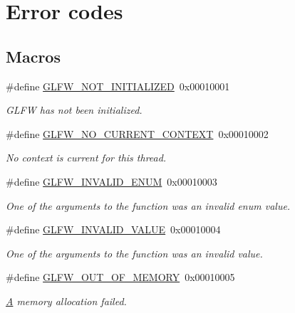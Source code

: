 \hypertarget{group__errors}{}\section{Error codes}
\label{group__errors}
\subsection*{Macros}
\begin{DoxyCompactItemize}
\item 
\#define \hyperlink{group__errors_ga2374ee02c177f12e1fa76ff3ed15e14a}{G\+L\+F\+W\+\_\+\+N\+O\+T\+\_\+\+I\+N\+I\+T\+I\+A\+L\+I\+Z\+E\+D}~0x00010001
\begin{DoxyCompactList}\small\item\em G\+L\+F\+W has not been initialized. \end{DoxyCompactList}\item 
\#define \hyperlink{group__errors_gaa8290386e9528ccb9e42a3a4e16fc0d0}{G\+L\+F\+W\+\_\+\+N\+O\+\_\+\+C\+U\+R\+R\+E\+N\+T\+\_\+\+C\+O\+N\+T\+E\+X\+T}~0x00010002
\begin{DoxyCompactList}\small\item\em No context is current for this thread. \end{DoxyCompactList}\item 
\#define \hyperlink{group__errors_ga76f6bb9c4eea73db675f096b404593ce}{G\+L\+F\+W\+\_\+\+I\+N\+V\+A\+L\+I\+D\+\_\+\+E\+N\+U\+M}~0x00010003
\begin{DoxyCompactList}\small\item\em One of the arguments to the function was an invalid enum value. \end{DoxyCompactList}\item 
\#define \hyperlink{group__errors_gaaf2ef9aa8202c2b82ac2d921e554c687}{G\+L\+F\+W\+\_\+\+I\+N\+V\+A\+L\+I\+D\+\_\+\+V\+A\+L\+U\+E}~0x00010004
\begin{DoxyCompactList}\small\item\em One of the arguments to the function was an invalid value. \end{DoxyCompactList}\item 
\#define \hyperlink{group__errors_ga9023953a2bcb98c2906afd071d21ee7f}{G\+L\+F\+W\+\_\+\+O\+U\+T\+\_\+\+O\+F\+\_\+\+M\+E\+M\+O\+R\+Y}~0x00010005
\begin{DoxyCompactList}\small\item\em \hyperlink{structA}{A} memory allocation failed. \end{DoxyCompactList}\item 

\end{DoxyCompactItemize}
